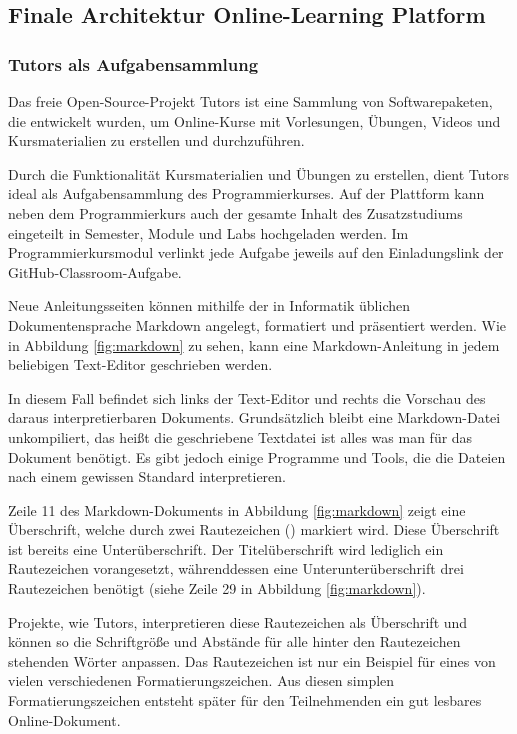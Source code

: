 \subsection{Finale Architektur Online-Learning Platform}
\subsubsection{Tutors als Aufgabensammlung}
Das freie Open-Source-Projekt Tutors ist eine Sammlung von Softwarepaketen,
die entwickelt wurden, um Online-Kurse mit Vorlesungen, Übungen, Videos und
Kursmaterialien zu erstellen und durchzuführen. \parencite{tutors}

Durch die Funktionalität Kursmaterialien und Übungen zu erstellen, dient Tutors
ideal als Aufgabensammlung des Programmierkurses. Auf der Plattform kann neben
dem Programmierkurs auch der gesamte Inhalt des Zusatzstudiums eingeteilt in
Semester, Module und Labs hochgeladen werden. Im Programmierkursmodul verlinkt
jede Aufgabe jeweils auf den Einladungslink der GitHub-Classroom-Aufgabe.

Neue Anleitungsseiten können mithilfe der in Informatik üblichen
Dokumentensprache Markdown angelegt, formatiert und präsentiert werden. Wie in
Abbildung \ref{fig:markdown} zu sehen, kann eine Markdown-Anleitung in jedem
beliebigen Text-Editor geschrieben werden.

In diesem Fall befindet sich links der Text-Editor und rechts die Vorschau des
daraus interpretierbaren Dokuments. Grundsätzlich bleibt eine Markdown-Datei
unkompiliert, das heißt die geschriebene Textdatei ist alles was man für das
Dokument benötigt. Es gibt jedoch einige Programme und Tools, die die Dateien
nach einem gewissen Standard interpretieren.

Zeile 11 des Markdown-Dokuments in Abbildung \ref{fig:markdown} zeigt eine
Überschrift, welche durch zwei Rautezeichen (\code{\#\#}) markiert wird. Diese
Überschrift ist bereits eine Unterüberschrift. Der Titelüberschrift wird
lediglich ein Rautezeichen vorangesetzt, währenddessen eine
Unterunterüberschrift drei Rautezeichen benötigt (siehe Zeile 29 in Abbildung
\ref{fig:markdown}).

Projekte, wie Tutors, interpretieren diese Rautezeichen als Überschrift und
können so die Schriftgröße und Abstände für alle hinter den Rautezeichen
stehenden Wörter anpassen. Das Rautezeichen ist nur ein Beispiel für eines von
vielen verschiedenen Formatierungszeichen. Aus diesen simplen
Formatierungszeichen entsteht später für den Teilnehmenden ein gut lesbares
Online-Dokument.


